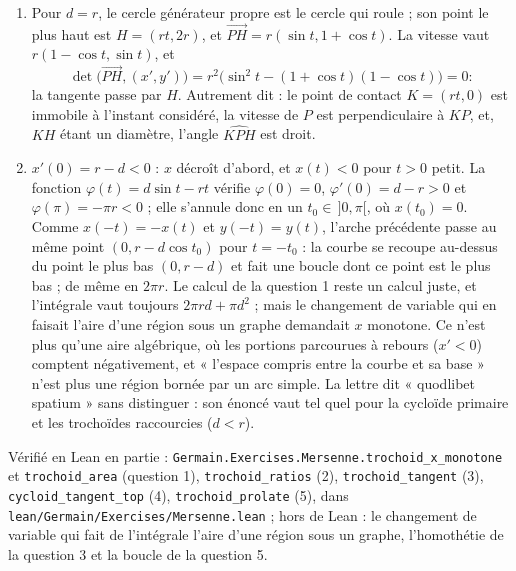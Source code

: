 \documentclass[11pt,a4paper]{article}
\begin{document}
\begin{solution}
\begin{enumerate}
\[  = \frac{\lambda}{d}\,(x'(t), y'(t)),
  \]
  donc $SP$ porte la vitesse : c'est la tangente. (Si $\sin t = 0$, $P$ est au plus
  haut ou au plus bas, la vitesse est horizontale et la règle dégénère.) Une
  parallèle à la base se déduit de la base par une homothétie de centre $P$ ; elle
  envoie $T$ et $S$ sur deux points $T'$, $S'$ de la parallèle, conserve le rapport
  $PT' : T'S'$ et la direction de $PS$ : la construction faite sur la parallèle
  donne la même droite.
\item Pour $d = r$, le cercle générateur propre est le cercle qui roule ; son point
  le plus haut est $H = (rt, 2r)$, et $\overrightarrow{PH} = r(\sin t, 1 + \cos t)$.
  La vitesse vaut $r(1 - \cos t, \sin t)$, et
  \[
  \det\bigl(\overrightarrow{PH}, (x', y')\bigr) = r^2\bigl(\sin^2 t - (1 + \cos t)(1 - \cos t)\bigr) = 0 :
  \]
  la tangente passe par $H$. Autrement dit : le point de contact $K = (rt, 0)$ est
  immobile à l'instant considéré, la vitesse de $P$ est perpendiculaire à $KP$, et,
  $KH$ étant un diamètre, l'angle $\widehat{KPH}$ est droit.
\item $x'(0) = r - d < 0$ : $x$ décroît d'abord, et $x(t) < 0$ pour $t > 0$ petit.
  La fonction $\varphi(t) = d\sin t - rt$ vérifie $\varphi(0) = 0$,
  $\varphi'(0) = d - r > 0$ et $\varphi(\pi) = -\pi r < 0$ ; elle s'annule donc en
  un $t_0 \in\, ]0, \pi[$, où $x(t_0) = 0$. Comme $x(-t) = -x(t)$ et $y(-t) = y(t)$,
  l'arche précédente passe au même point $(0, r - d\cos t_0)$ pour $t = -t_0$ : la
  courbe se recoupe au-dessus du point le plus bas $(0, r - d)$ et fait une boucle
  dont ce point est le plus bas ; de même en $2\pi r$. Le calcul de la question 1 reste un calcul
  juste, et l'intégrale vaut toujours $2\pi r d + \pi d^2$ ; mais le changement de
  variable qui en faisait l'aire d'une région sous un graphe demandait $x$
  monotone. Ce n'est plus qu'une aire algébrique, où les portions parcourues à
  rebours ($x' < 0$) comptent négativement, et « l'espace compris entre la courbe
  et sa base » n'est plus une région bornée par un arc simple. La lettre dit
  « quodlibet spatium » sans distinguer : son énoncé vaut tel quel pour la
  cycloïde primaire et les trochoïdes raccourcies ($d < r$).
\end{enumerate}

Vérifié en Lean en partie : \texttt{Germain.Exercises.Mersenne.trochoid\_x\_monotone} et
\texttt{trochoid\_area} (question 1), \texttt{trochoid\_ratios} (2), \texttt{trochoid\_tangent} (3),
\texttt{cycloid\_tangent\_top} (4), \texttt{trochoid\_prolate} (5), dans \texttt{lean/Germain/Exercises/Mersenne.lean} ;
hors de Lean : le changement de variable qui fait de l'intégrale l'aire d'une région sous un
graphe, l'homothétie de la question 3 et la boucle de la question 5.

\end{solution}
\end{document}
